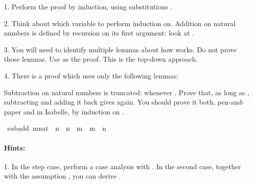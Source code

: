 \begin{isabellebody}
\begin{isamarkuptext}
 1. Perform the proof by induction, using substitutions .

 2. Think about which variable to perform induction on. Addition on natural numbers is defined by
    recursion on its first argument: look at .

 3. You will need to identify multiple lemmas about how  works. Do not prove those lemmas. Use
     as the proof. This is the top-down approach.

 4. There is a proof which uses only the following lemmas: %
\end{isamarkuptext}\isamarkuptrue%
%
\isadelimproof
%
\endisadelimproof
%
\isatagproof
%
\endisatagproof
{\isafoldproof}%
%
\isadelimproof
%
\endisadelimproof
%
\begin{isamarkuptext}%
%
\end{isamarkuptext}\isamarkuptrue%
%
\begin{isamarkuptext}%
Subtraction on natural numbers is truncated:  whenever . Prove that, as long
      as , subtracting  and adding it back gives  again. You should prove it both,
      pen-and-paper and in Isabelle, by induction on .%
\end{isamarkuptext}\isamarkuptrue%
\isamarkupfalse%
\ sub{\isacharunderscore}{\kern0pt}add{\isacharcolon}{\kern0pt}\ {\isachardoublequoteopen}{\isacharparenleft}{\kern0pt}m{\isacharcolon}{\kern0pt}{\isacharcolon}{\kern0pt}nat{\isacharparenright}{\kern0pt}\ {\isasymle}\ n\ {\isasymLongrightarrow}\ {\isacharparenleft}{\kern0pt}n\ {\isacharminus}{\kern0pt}\ m{\isacharparenright}{\kern0pt}\ {\isacharplus}{\kern0pt}\ m\ {\isacharequal}{\kern0pt}\ n{\isachardoublequoteclose}%
\begin{isamarkuptext}%
\paragraph{Hints:}
 1. In the step case, perform a case analysis with . In the second case,
    together with the assumption , you can derive .


\end{isamarkuptext}
\end{isabellebody}

